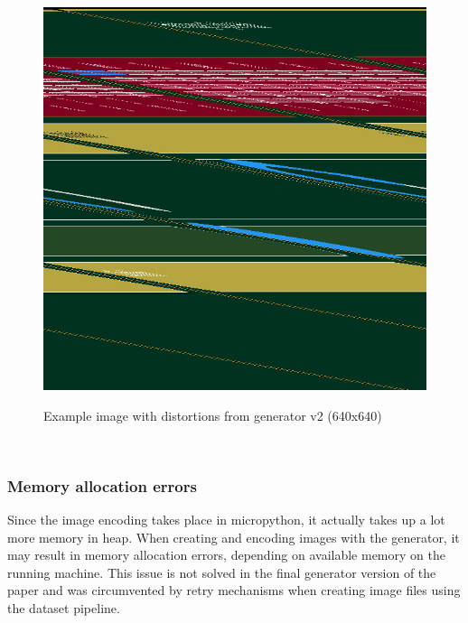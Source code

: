 \documentclass[Bachelor, BIC, english, fhCitStyle, IEEE]{BASE/twbook} %
\newcommand{\nocontentsline}[3]{}
\newcommand{\hidsubsubsection}[1]{\bgroup\let\addcontentsline=\nocontentsline\subsubsection{#1}\egroup}
\begin{document}
\begin{figure}[H]
    \caption{Example image with distortions from generator v2 (640x640)}
    \centering
    \includegraphics[height=0.4\textheight]{distorted_image_example.jpg}
    \label{fig:genv2distortedexample}
\end{figure}\\
\hidsubsubsection{Memory allocation errors}
\noindent
Since the image encoding takes place in micropython, it actually takes up a lot more memory in heap. When creating and encoding images with the generator, it may result in memory allocation errors, depending on available memory on the running machine. This issue is not solved in the final generator version of the paper and was circumvented by retry mechanisms when creating image files using the dataset pipeline.
\newpage
\end{document}
